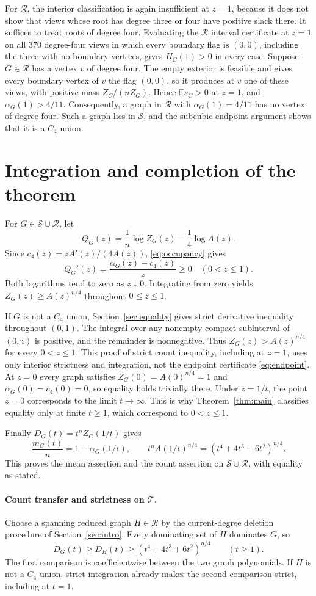 \documentclass[11pt]{article}
\newcommand{\E}{\mathbb E}\newcommand{\Prob}{\mathbb P}
\begin{document}
For $\mathcal R$, the interior classification is again insufficient at $z=1$, because it does not show that views whose root has degree three or four have positive slack there. It suffices to treat roots of degree four. Evaluating the $\mathcal R$ interval certificate at $z=1$ on all $370$ degree-four views in which every boundary flag is $(0,0)$, including the three with no boundary vertices, gives $H_C(1)>0$ in every case. Suppose $G\in\mathcal R$ has a vertex $v$ of degree four. The empty exterior is feasible and gives every boundary vertex of $v$ the flag $(0,0)$, so it produces at $v$ one of these views, with positive mass $Z_C/(nZ_G)$. Hence $\E s_C>0$ at $z=1$, and $\alpha_G(1)>4/11$. Consequently, a graph in $\mathcal R$ with $\alpha_G(1)=4/11$ has no vertex of degree four. Such a graph lies in $\mathcal S$, and the subcubic endpoint argument shows that it is a $C_4$ union. 

\section{Integration and completion of the theorem}\label{sec:integration}
For $G\in\mathcal S\cup\mathcal R$, let
\[
 Q_G(z)=\frac1n\log Z_G(z)-\frac14\log A(z).
\]
Since $c_4(z)=zA'(z)/(4A(z))$, \eqref{eq:occupancy} gives
\[
 Q_G'(z)=\frac{\alpha_G(z)-c_4(z)}z\ge0\quad(0<z\le1).
\]
Both logarithms tend to zero as $z\downarrow0$. Integrating from zero yields $Z_G(z)\ge A(z)^{n/4}$ throughout $0\le z\le1$.

If $G$ is not a $C_4$ union, Section~\ref{sec:equality} gives strict derivative inequality throughout $(0,1)$. The integral over any nonempty compact subinterval of $(0,z)$ is positive, and the remainder is nonnegative. Thus $Z_G(z)>A(z)^{n/4}$ for every $0<z\le1$. This proof of strict count inequality, including at $z=1$, uses only interior strictness and integration, not the endpoint certificate \eqref{eq:endpoint}. At $z=0$ every graph satisfies $Z_G(0)=A(0)^{n/4}=1$ and $\alpha_G(0)=c_4(0)=0$, so equality holds trivially there. Under $z=1/t$, the point $z=0$ corresponds to the limit $t\to\infty$. This is why Theorem~\ref{thm:main} classifies equality only at finite $t\ge1$, which correspond to $0<z\le1$.

Finally $D_G(t)=t^nZ_G(1/t)$ gives
\[
 \frac{m_G(t)}n=1-\alpha_G(1/t),\qquad
 t^nA(1/t)^{n/4}=(t^4+4t^3+6t^2)^{n/4}.
\]
This proves the mean assertion and the count assertion on $\mathcal S\cup\mathcal R$, with equality as stated. 

\paragraph{Count transfer and strictness on $\mathcal T$.}
Choose a spanning reduced graph $H\in\mathcal R$ by the current-degree deletion procedure of Section~\ref{sec:intro}. Every dominating set of $H$ dominates $G$, so
\[
 D_G(t)\ge D_H(t)\ge(t^4+4t^3+6t^2)^{n/4}\qquad(t\ge1).
\]
The first comparison is coefficientwise between the two graph polynomials. If $H$ is not a $C_4$ union, strict integration already makes the second comparison strict, including at $t=1$.
\end{document}
